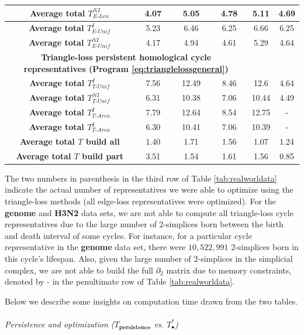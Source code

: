 \documentclass[11pt,onecolumn]{article}
\newcommand{\tab}{Table }
\newcommand{\NI}{^{NI}}
\newcommand{\I}{^I}
\newcommand{\pr}{Program }
\newcommand{\EU}{_{E\text{-}Unif}}
\newcommand{\EL}{_{E\text{-}Len}}
\newcommand{\TU}{_{T\text{-}Unif}}
\newcommand{\TA}{_{T\text{-}Area}}
\theoremstyle{plain}
\theoremstyle{definition}
\begin{document}
\begin{table}[H]
\begin{tabular}{ |c || c |c |c |c | c|}
 \textbf{Average total $T\NI\EL$  } & 4.07 & 5.05 & 4.78 &5.11 & 4.69 \\ \hline 
 \textbf{Average total $T\I\EU$  } &5.23 & 6.46 & 6.25 & 6.66& 6.25\\ \hline
 \textbf{Average total $T\NI\EU$  } & 4.17 & 4.94 & 4.61 & 5.29 & 4.64\\ 
[0.5ex] 
\hline
\multicolumn{4}{c}{\textbf{Triangle-loss persistent homological cycle representatives (\pr \eqref{eq:trianglelossgeneral})}} & \\
\hline
 \textbf{Average total $T\I\TU$  } & 7.56 & 12.49 & 8.46 & 12.6 & 4.64\\ 
 \hline 
 \textbf{Average total $T\NI\TU$  }&  6.31 & 10.38 & 7.06 & 10.44 & 4.49 \\  \hline
 \textbf{Average total $T\I\TA$  } &  7.79 & 12.64 & 8.54 & 12.75 & - \\  \hline
 \textbf{Average total $T\I\TA$  } &  6.30 & 10.41 & 7.06 &  10.39 & - \\  \hline
 \hline
  \textbf{Average total $T$ build all} & 1.40 & 1.71 &  1.56 & 1.07& 1.24 \\ 
  \hline
  \textbf{Average total $T$ build part } & 3.51 & 1.54 &    1.61 & 1.56 & 0.85\\ 
 \hline
 
\end{tabular}
\label{tab:distributiondata}  
\end{table}



The two numbers in parenthesis in the third row of \tab \ref{tab:realworldata} indicate the actual number of representatives we were able to optimize using the triangle-loss methods (all edge-loss representatives were optimized). For the \textbf{genome} and \textbf{H3N2} data sets, we are not able to compute all triangle-loss cycle representatives due to the large number of 2-simplices born between the birth and death interval of some cycles. For instance, for a particular cycle representative in the \textbf{genome} data set, there were $10{,}522{,}991$ 2-simplices born in this cycle's lifespan. 
Also, given the large number of $2$-simplices in the simplicial complex, we are not able to build the full $\partial_2$ matrix due to memory constraints, denoted by - in the penultimate row of \tab \ref{tab:realworldata}. 

Below we describe some insights on computation time drawn from the two tables. 
\\
\\
\noindent \emph{Persistence and optimization ($T_\textbf{persistence}$ vs. $T_\bullet^*$)}
\end{document}
